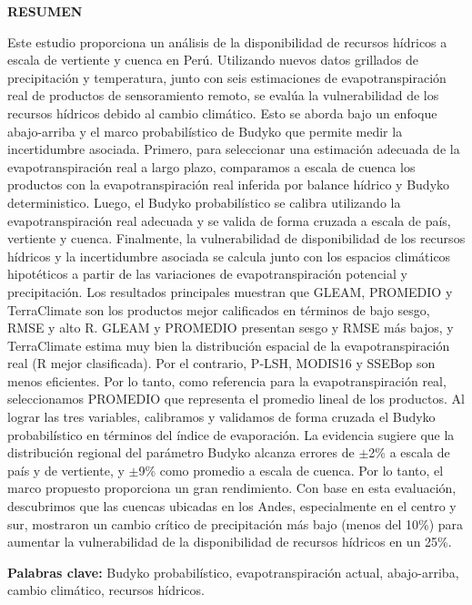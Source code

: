 \begin{center}
\large{\textbf {RESUMEN}}
\end{center}

Este estudio proporciona un análisis de la disponibilidad de recursos hídricos a escala de vertiente y cuenca en Perú. Utilizando nuevos datos grillados de precipitación y temperatura, junto con seis estimaciones de evapotranspiración real de productos de sensoramiento remoto, se evalúa la vulnerabilidad de los recursos hídricos debido al cambio climático. Esto se aborda bajo un enfoque abajo-arriba y el marco probabilístico de Budyko que permite medir la incertidumbre asociada. Primero, para seleccionar una estimación adecuada de la evapotranspiración real a largo plazo, comparamos a escala de cuenca los productos con la evapotranspiración real inferida por balance hídrico y Budyko deterministico. Luego, el Budyko probabilístico se calibra utilizando la evapotranspiración real adecuada y se valida de forma cruzada a escala de país, vertiente y cuenca. Finalmente, la vulnerabilidad de disponibilidad de los recursos hídricos y la incertidumbre asociada se calcula junto con los espacios climáticos hipotéticos a partir de las variaciones de evapotranspiración potencial y precipitación. Los resultados principales muestran que GLEAM, PROMEDIO y TerraClimate son los productos mejor calificados en términos de bajo sesgo, RMSE y alto R. GLEAM y PROMEDIO presentan sesgo y RMSE más bajos, y TerraClimate estima muy bien la distribución espacial de la evapotranspiración real (R mejor clasificada). Por el contrario, P‐LSH, MODIS16 y SSEBop son menos eficientes. Por lo tanto, como referencia para la evapotranspiración real, seleccionamos PROMEDIO que representa el promedio lineal de los productos. Al lograr las tres variables, calibramos y validamos de forma cruzada el Budyko probabilístico en términos del índice de evaporación. La evidencia sugiere que la distribución regional del parámetro Budyko alcanza errores de $\pm$2\% a escala de país y de vertiente, y $\pm$9\% como promedio a escala de cuenca. Por lo tanto, el marco propuesto proporciona un gran rendimiento. Con base en esta evaluación, descubrimos que las cuencas ubicadas en los Andes, especialmente en el centro y sur, mostraron un cambio crítico de precipitación más bajo (menos del 10\%) para aumentar la vulnerabilidad de la disponibilidad de recursos hídricos en un 25\%.

\textbf {Palabras clave:} Budyko probabilístico, evapotranspiración actual, abajo-arriba, cambio climático, recursos hídricos.

